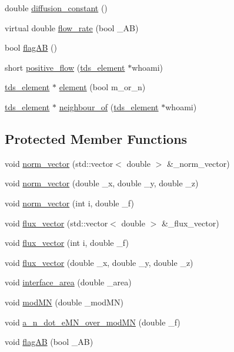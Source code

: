 \begin{DoxyCompactItemize}
\item 
double \hyperlink{classtds__element__link_a082ea48fa62b672e7ecc5fac8471bcd4}{diffusion\-\_\-constant} ()
\item 
virtual double \hyperlink{classtds__element__link_a2e4a02f2f8cc4941d15734369456f8b7}{flow\-\_\-rate} (bool \-\_\-\-A\-B)
\item 
bool \hyperlink{classtds__element__link_ab3e019113be7a93d6c9ab7faa6350de1}{flag\-A\-B} ()
\item 
short \hyperlink{classtds__element__link_a89ed003b00e4c46416ad7bf3a2d5726e}{positive\-\_\-flow} (\hyperlink{classtds__element}{tds\-\_\-element} $\ast$whoami)
\item 
\hyperlink{classtds__element}{tds\-\_\-element} $\ast$ \hyperlink{classtds__element__link_a4bb693cb080175f184165f5cde55f388}{element} (bool m\-\_\-or\-\_\-n)
\item 
\hyperlink{classtds__element}{tds\-\_\-element} $\ast$ \hyperlink{classtds__element__link_a8c8f17de458d006c051611423a261cfe}{neighbour\-\_\-of} (\hyperlink{classtds__element}{tds\-\_\-element} $\ast$whoami)
\end{DoxyCompactItemize}
\subsection*{Protected Member Functions}
\begin{DoxyCompactItemize}
\item 
void \hyperlink{classtds__element__link_a56039e834e45fba5357a3c10624dc535}{norm\-\_\-vector} (std\-::vector$<$ double $>$ \&\-\_\-norm\-\_\-vector)
\item 
void \hyperlink{classtds__element__link_a4520a07ec97ea614cbc1612f371a55ef}{norm\-\_\-vector} (double \-\_\-x, double \-\_\-y, double \-\_\-z)
\item 
void \hyperlink{classtds__element__link_a2ea4f8a444101e436803d76a2b2420a3}{norm\-\_\-vector} (int i, double \-\_\-f)
\item 
void \hyperlink{classtds__element__link_ad1f6c9650855f5512efb3c6391bba8d3}{flux\-\_\-vector} (std\-::vector$<$ double $>$ \&\-\_\-flux\-\_\-vector)
\item 
void \hyperlink{classtds__element__link_aa013152cdc8496bfb63693d5f1ff934c}{flux\-\_\-vector} (int i, double \-\_\-f)
\item 
void \hyperlink{classtds__element__link_a6a4ed11aefe84f0b9def9fed5da4aa69}{flux\-\_\-vector} (double \-\_\-x, double \-\_\-y, double \-\_\-z)
\item 
void \hyperlink{classtds__element__link_ae49a77335f5a0ae662923a995fc306eb}{interface\-\_\-area} (double \-\_\-area)
\item 
void \hyperlink{classtds__element__link_a7ad521d65162f26fb5b765ed9e3c4292}{mod\-M\-N} (double \-\_\-mod\-M\-N)
\item 
void \hyperlink{classtds__element__link_a9261e32eddd0179b59db7fc705a8b1ce}{a\-\_\-n\-\_\-dot\-\_\-e\-M\-N\-\_\-over\-\_\-mod\-M\-N} (double \-\_\-f)
\item 
void \hyperlink{classtds__element__link_adecad014f5537e295e74290bf6e2bb5c}{flag\-A\-B} (bool \-\_\-\-A\-B)
\end{DoxyCompactItemize}


